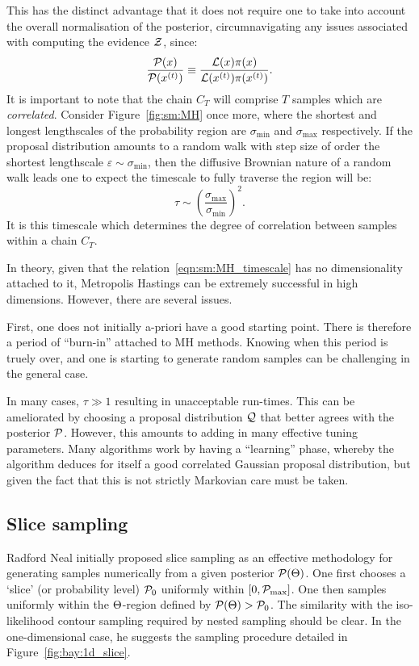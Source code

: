 This has the distinct advantage that it does not require one to take into account the overall normalisation of the posterior, circumnavigating any issues associated with computing the evidence \(\mathcal{Z}\), since:
\begin{equation}
  \frac{\mathcal{P}(x)}{\mathcal{P}(x^{(t)})} \equiv
  \frac{\mathcal{L}(x)\pi(x)}{\mathcal{L}(x^{(t)})\pi(x^{(t)})}.
\end{equation}
It is important to note that the chain \(C_T\) will comprise \(T\) samples which are {\em correlated}. Consider Figure~\ref{fig:sm:MH} once more, where the shortest and longest lengthscales of the probability region are \(\sigma_{\min{}}\) and \(\sigma_{\max{}}\) respectively. If the proposal distribution amounts to a random walk with step size of order the shortest lengthscale \(\varepsilon\sim\sigma_{\min{}}\), then the diffusive Brownian nature of a random walk leads one to expect the timescale to fully traverse the region will be:
\begin{equation}
    \tau \sim {\left( \frac{\sigma_{\max{}}}{\sigma_{\min{}}} \right)}^2.
    \label{eqn:sm:MH_timescale}
\end{equation}
It is this timescale which determines the degree of correlation between samples within a chain \(C_T\).

In theory, given that the relation~\eqref{eqn:sm:MH_timescale} has no dimensionality attached to it, Metropolis Hastings can be extremely successful in high dimensions. However, there are several issues.

First, one does not initially a-priori have a good starting point. There is therefore a period of ``burn-in'' attached to MH methods. Knowing when this period is truely over, and one is starting to generate random samples can be challenging in the general case.

In many cases, \(\tau\gg1\) resulting in unacceptable run-times. This can be ameliorated by choosing a proposal distribution \(\mathcal{Q}\) that better agrees with the posterior \(\mathcal{P}\). However, this amounts to adding in many effective tuning parameters. Many algorithms work by having a ``learning'' phase, whereby the algorithm deduces for itself a good correlated Gaussian proposal distribution, but given the fact that this is not strictly Markovian care must be taken.



\subsection{Slice sampling}
\label{sec:sm:slice}
Radford Neal initially proposed slice sampling as an effective methodology for generating samples numerically from a given posterior \(\mathcal{P}(\Theta)\). One first chooses a `slice' (or probability level) \(\mathcal{P}_0\) uniformly within \([0,\mathcal{P}_{\mathrm{max}}]\). One then samples uniformly within the \(\Theta\)-region defined by \(\mathcal{P}(\Theta)>\mathcal{P}_0\). The similarity with the iso-likelihood contour sampling required by nested sampling should be clear. In the one-dimensional case, he suggests the sampling procedure detailed in Figure~\ref{fig:bay:1d_slice}.


